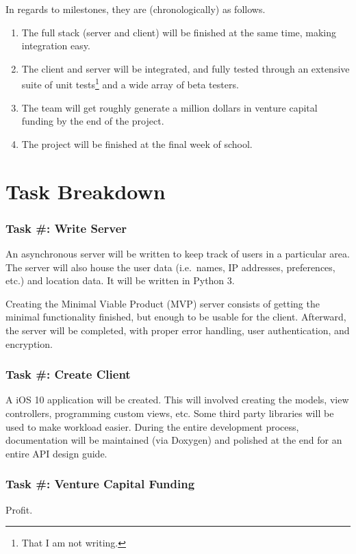 \documentclass[12pt]{scrartcl}
\newcounter{tasks}
\newcommand{\task}[1]{%
    \addtocounter{tasks}{1}
    \subsubsection*{Task \#\thetasks: #1}
}
\begin{document}
\noindent In regards to milestones, they are (chronologically) as follows.

\begin{enumerate}
    \item The full stack (server and client) will be finished at the same time, making integration easy.
    \item The client and server will be integrated, and fully tested through an extensive suite of unit tests\footnote{That I am not writing.} and a wide array of beta testers. 
    \item The team will get roughly generate a million dollars in venture capital funding by the end of the project.
    \item The project will be finished at the final week of school.
\end{enumerate}

\section{Task Breakdown}
\task{Write Server}
An asynchronous server will be written to keep track of users in a particular area. The server will also house the user data (i.e.\ names, IP addresses, preferences, etc.) and location data. It will be written in Python 3.

Creating the Minimal Viable Product (MVP) server consists of getting the minimal functionality finished, but enough to be usable for the client. Afterward, the server will be completed, with proper error handling, user authentication, and encryption.

\task{Create Client}
A iOS 10 application will be created. This will involved creating the models, view controllers, programming custom views, etc. Some third party libraries will be used to make workload easier. During the entire development process, documentation will be maintained (via Doxygen) and polished at the end for an entire API design guide.

\task{Venture Capital Funding}
Profit.
\end{document}
